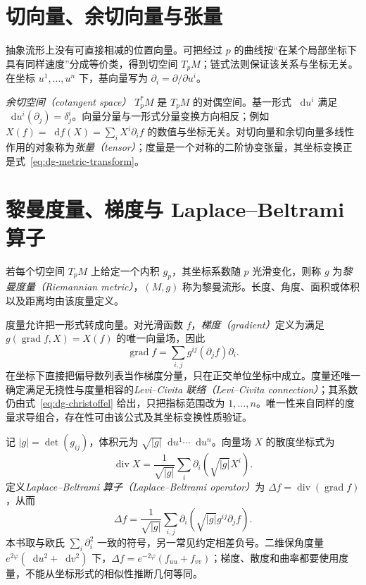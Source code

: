 \documentclass[UTF8,12pt,a4paper,fontset=fandol]{ctexbook}
\newcommand{\dd}{\mathop{}\!\mathrm d}
\DeclareMathOperator{\grad}{grad}
\begin{document}
\section{切向量、余切向量与张量}
抽象流形上没有可直接相减的位置向量。可把经过 $p$ 的曲线按“在某个局部坐标下具有同样速度”分成等价类，得到切空间 $T_pM$；链式法则保证该关系与坐标无关。在坐标 $u^1,\ldots,u^n$ 下，基向量写为 $\partial_i=\partial/\partial u^i$。

\emph{余切空间（cotangent space）} $T_p^*M$ 是 $T_pM$ 的对偶空间。基一形式 $\dd u^i$ 满足 $\dd u^i(\partial_j)=\delta^i_j$。向量分量与一形式分量变换方向相反；例如 $X(f)=\dd f(X)=\sum_iX^i\partial_i f$ 的数值与坐标无关。对切向量和余切向量多线性作用的对象称为\emph{张量（tensor）}；度量是一个对称的二阶协变张量，其坐标变换正是式~\eqref{eq:dg-metric-transform}。

\section{黎曼度量、梯度与 Laplace--Beltrami 算子}
\begin{definition}[黎曼度量]
若每个切空间 $T_pM$ 上给定一个内积 $g_p$，其坐标系数随 $p$ 光滑变化，则称 $g$ 为\emph{黎曼度量（Riemannian metric）}，$(M,g)$ 称为黎曼流形。长度、角度、面积或体积以及距离均由该度量定义。
\end{definition}
度量允许把一形式转成向量。对光滑函数 $f$，\emph{梯度（gradient）}定义为满足 $g(\grad f,X)=X(f)$ 的唯一向量场，因此
\[
 \grad f=\sum_{i,j}g^{ij}(\partial_jf)\partial_i.
\]
在坐标下直接把偏导数列表当作梯度分量，只在正交单位坐标中成立。度量还唯一确定满足无挠性与度量相容的\emph{Levi--Civita 联络（Levi--Civita connection）}；其系数仍由式~\eqref{eq:dg-christoffel} 给出，只把指标范围改为 $1,\ldots,n$。唯一性来自同样的度量求导组合，存在性可由该公式及其坐标变换性质验证。

记 $|g|=\det(g_{ij})$，体积元为 $\sqrt{|g|}\dd u^1\cdots\dd u^n$。向量场 $X$ 的散度坐标式为
\[
 \operatorname{div}X=\frac1{\sqrt{|g|}}\sum_i\partial_i(\sqrt{|g|}X^i).
\]
定义\emph{Laplace--Beltrami 算子（Laplace--Beltrami operator）}为 $\Delta f=\operatorname{div}(\grad f)$，从而
\begin{equation}
 \Delta f=\frac1{\sqrt{|g|}}\sum_{i,j}
 \partial_i\left(\sqrt{|g|}g^{ij}\partial_jf\right).
 \label{eq:dg-laplacian}
\end{equation}
本书取与欧氏 $\sum_i\partial_i^2$ 一致的符号，另一常见约定相差负号。二维保角度量 $e^{2\varphi}(\dd u^2+\dd v^2)$ 下，$\Delta f=e^{-2\varphi}(f_{uu}+f_{vv})$；梯度、散度和曲率都要使用度量，不能从坐标形式的相似性推断几何等同。
\end{document}
